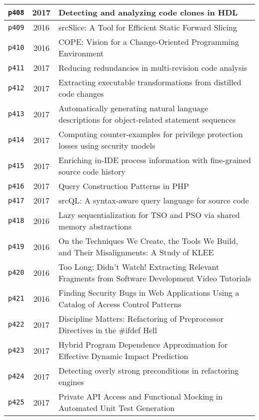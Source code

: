 \begin{longtable}{| c | c | p{16cm} |}
  \hline
  \texttt{p408} & 2017 & Detecting and analyzing code clones in HDL \\
  \hline
  \texttt{p409} & 2016 & srcSlice: A Tool for Efficient Static Forward Slicing \\
  \hline
  \texttt{p410} & 2016 & COPE: Vision for a Change-Oriented Programming Environment \\
  \hline
  \texttt{p411} & 2017 & Reducing redundancies in multi-revision code analysis \\
  \hline
  \texttt{p412} & 2017 & Extracting executable transformations from distilled code changes \\
  \hline
  \texttt{p413} & 2017 & Automatically generating natural language descriptions for object-related statement sequences \\
  \hline
  \texttt{p414} & 2017 & Computing counter-examples for privilege protection losses using security models \\
  \hline
  \texttt{p415} & 2017 & Enriching in-IDE process information with fine-grained source code history \\
  \hline
  \texttt{p416} & 2017 & Query Construction Patterns in PHP \\
  \hline
  \texttt{p417} & 2017 & srcQL: A syntax-aware query language for source code \\
  \hline
  \texttt{p418} & 2016 & Lazy sequentialization for TSO and PSO via shared memory abstractions \\
  \hline
  \texttt{p419} & 2016 & On the Techniques We Create, the Tools We Build, and Their Misalignments: A Study of KLEE \\
  \hline
  \texttt{p420} & 2016 & Too Long; Didn't Watch! Extracting Relevant Fragments from Software Development Video Tutorials \\
  \hline
  \texttt{p421} & 2016 & Finding Security Bugs in Web Applications Using a Catalog of Access Control Patterns \\
  \hline
  \texttt{p422} & 2017 & Discipline Matters: Refactoring of Preprocessor Directives in the \#ifdef Hell \\
  \hline
  \texttt{p423} & 2017 & Hybrid Program Dependence Approximation for Effective Dynamic Impact Prediction \\
  \hline
  \texttt{p424} & 2017 & Detecting overly strong preconditions in refactoring engines \\
  \hline
  \texttt{p425} & 2017 & Private API Access and Functional Mocking in Automated Unit Test Generation \\

\end{longtable}
